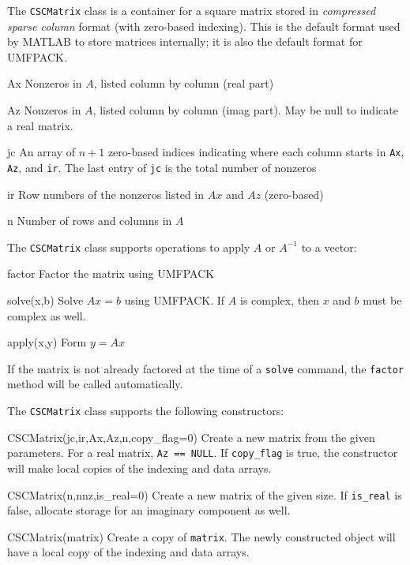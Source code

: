 \documentclass{article}
\newenvironment{codelist}[1][\quad]%
  {\begin{list}{}{%
   \settowidth{\labelwidth}{\texttt{#1}\hfil}%
   \setlength{\leftmargin}{\labelwidth}%
   \addtolength{\leftmargin}{\labelsep}%
   \addtolength{\leftmargin}{\parindent}%
   \renewcommand{\makelabel}[1]{\texttt{##1}}}}%
  {\end{list}}
\newcommand{\ttt}[1]{\texttt{#1}}
\begin{document}
The \ttt{CSCMatrix} class is a container for a square matrix stored
in \emph{compressed sparse column} format (with zero-based indexing).
This is the default format used by MATLAB to store matrices
internally; it is also the default format for UMFPACK.
\begin{codelist}[Az]
  \item[Ax]  Nonzeros in $A$, listed column by column (real part)
  \item[Az]  Nonzeros in $A$, listed column by column (imag part).
             May be null to indicate a real matrix.
  \item[jc]  An array of $n+1$ zero-based indices indicating where
    each column starts in \ttt{Ax}, \ttt{Az}, and \ttt{ir}.
    The last entry of \ttt{jc} is the total number of nonzeros
  \item[ir]  Row numbers of the nonzeros listed in $Ax$ and $Az$
    (zero-based)
  \item[n]   Number of rows and columns in $A$
\end{codelist}
The \ttt{CSCMatrix} class supports operations to apply $A$ or
$A^{-1}$ to a vector: 
\begin{codelist}[apply(x,y)]
 \item[factor]      Factor the matrix using UMFPACK
 \item[solve(x,b)]  Solve $Ax = b$ using UMFPACK.  If $A$ is complex,
   then $x$ and $b$ must be complex as well.
 \item[apply(x,y)]  Form $y = Ax$
\end{codelist}
If the matrix is not already factored at the time of a \ttt{solve}
command, the \ttt{factor} method will be called automatically.

The \ttt{CSCMatrix} class supports the following constructors:
\begin{codelist}
  \item[CSCMatrix(jc,ir,Ax,Az,n,copy\_flag=0)]
    Create a new matrix from the given parameters.  For a real matrix,
    \ttt{Az == NULL}.  If \ttt{copy\_flag} is true, the constructor
    will make local copies of the indexing and data arrays.

  \item[CSCMatrix(n,nnz,is\_real=0)]
    Create a new matrix of the given size.  If \ttt{is\_real} is false,
    allocate storage for an imaginary component as well.

  \item[CSCMatrix(matrix)]
    Create a copy of \ttt{matrix}.  The newly constructed object will
    have a local copy of the indexing and data arrays.

\end{codelist}
\end{document}
